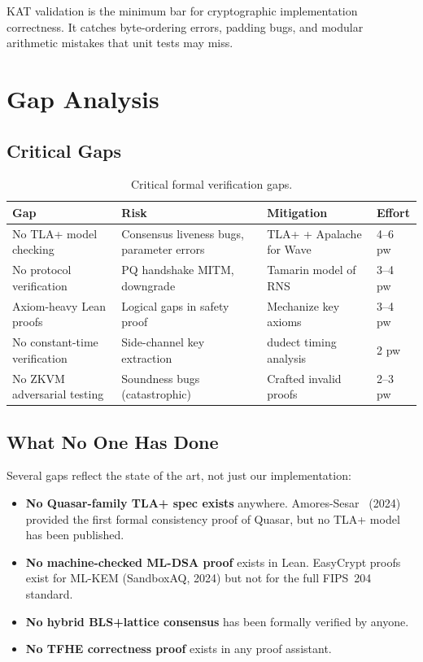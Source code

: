 \documentclass[11pt,letterpaper]{article}
\begin{document}
KAT validation is the minimum bar for cryptographic implementation correctness. It catches byte-ordering errors, padding bugs, and modular arithmetic mistakes that unit tests may miss.

\section{Gap Analysis}

\subsection{Critical Gaps}

\begin{table}[H]
\centering
\small
\begin{tabular}{@{}lp{3.5cm}p{3cm}l@{}}
\toprule
\textbf{Gap} & \textbf{Risk} & \textbf{Mitigation} & \textbf{Effort} \\
\midrule
No TLA+ model checking & Consensus liveness bugs, parameter errors & TLA+ + Apalache for Wave & 4--6 pw \\
No protocol verification & PQ handshake MITM, downgrade & Tamarin model of RNS & 3--4 pw \\
Axiom-heavy Lean proofs & Logical gaps in safety proof & Mechanize key axioms & 3--4 pw \\
No constant-time verification & Side-channel key extraction & dudect timing analysis & 2 pw \\
No ZKVM adversarial testing & Soundness bugs (catastrophic) & Crafted invalid proofs & 2--3 pw \\
\bottomrule
\end{tabular}
\caption{Critical formal verification gaps.}
\label{tab:gaps}
\end{table}

\subsection{What No One Has Done}

Several gaps reflect the state of the art, not just our implementation:

\begin{itemize}
\item \textbf{No Quasar-family TLA+ spec exists} anywhere. Amores-Sesar \etal\ (2024) provided the first formal consistency proof of Quasar, but no TLA+ model has been published.
\item \textbf{No machine-checked ML-DSA proof} exists in Lean. EasyCrypt proofs exist for ML-KEM (SandboxAQ, 2024) but not for the full FIPS~204 standard.
\item \textbf{No hybrid BLS+lattice consensus} has been formally verified by anyone.
\item \textbf{No TFHE correctness proof} exists in any proof assistant.
\end{itemize}
\end{document}
